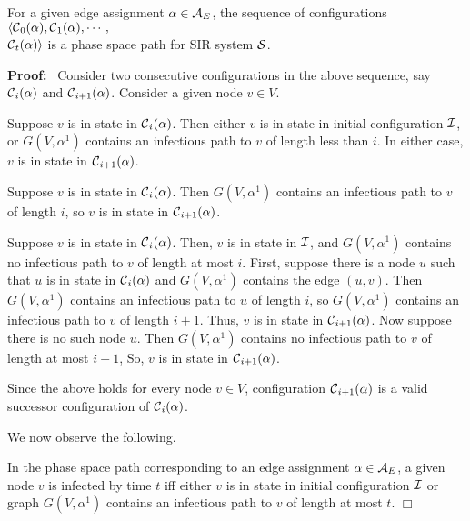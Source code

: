\begin{proposition}\label{pro:edge_assn_phase_space}
For a given edge assignment $\alpha \in {\cal A}_E$, the sequence of configurations
$\langle \mbox{${\cal C}$}{}_0(\alpha), \mbox{${\cal C}$}{}_1(\alpha), \cdots,$ \\
$\mbox{${\cal C}$}{}_t(\alpha)\rangle$
is a phase space path for SIR system $\mbox{${\cal S}$}{}$. 
\end{proposition}

\noindent
\textbf{Proof:}~
Consider two consecutive configurations in the above sequence, say
 $\mbox{${\cal C}$}{}_i(\alpha)$ and  $\mbox{${\cal C}$}{}_{i+1}(\alpha)$.
Consider a given node $v \in V$.

Suppose $v$ is in state \rstate{} in $\mbox{${\cal C}$}{}_i(\alpha)$.
Then either $v$ is in state \rstate{} in initial configuration $\mbox{${\cal I}$}{}$,
or $G(V, \alpha^1)$ contains an infectious path to $v$ of length less than $i$.
In either case,
$v$ is in state \rstate{} in $\mbox{${\cal C}$}{}_{i+1}(\alpha)$.

Suppose $v$ is in state \istate{} in $\mbox{${\cal C}$}{}_i(\alpha)$.
Then $G(V, \alpha^1)$ contains an infectious path to $v$ of length $i$,
so $v$ is in state \rstate{} in $\mbox{${\cal C}$}{}_{i+1}(\alpha)$.

Suppose $v$ is in state \sstate{} in $\mbox{${\cal C}$}{}_i(\alpha)$.
Then, $v$ is in state \sstate{} in $\mbox{${\cal I}$}{}$,
and $G(V, \alpha^1)$ contains no infectious path to $v$ of length at most $i$.
First, suppose there is a node $u$ such that 
$u$ is in state \istate{} in $\mbox{${\cal C}$}{}_i(\alpha)$
and $G(V, \alpha^1)$ contains the edge $(u,v)$.
Then $G(V, \alpha^1)$ contains an infectious path to $u$ of length $i$,
so $G(V, \alpha^1)$ contains an infectious path to $v$ of length $i+1$.
Thus, $v$ is in state \istate{} in $\mbox{${\cal C}$}{}_{i+1}(\alpha)$.
Now suppose there is no such node $u$.
Then $G(V, \alpha^1)$ contains no infectious path to $v$ of length at most $i+1$,
So, $v$ is in state \sstate{} in $\mbox{${\cal C}$}{}_{i+1}(\alpha)$.

Since the above holds for every node $v \in V$,
configuration $\mbox{${\cal C}$}{}_{i+1}(\alpha)$ is a valid successor configuration of $\mbox{${\cal C}$}{}_i(\alpha)$.
\QED

We now observe the following.

  \begin{proposition}\label{pro:infectious_path}
  In the phase space path corresponding to 
  an edge assignment $\alpha \in {\cal A}_E$, 
  a given node $v$ is infected by time $t$ iff
  either $v$ is in state \rstate{} in initial configuration $\mbox{${\cal I}$}{}$
  or graph $G(V, \alpha^1)$ contains an infectious path to $v$ 
of length at most $t$. \hfill$\Box$
 \end{proposition}

